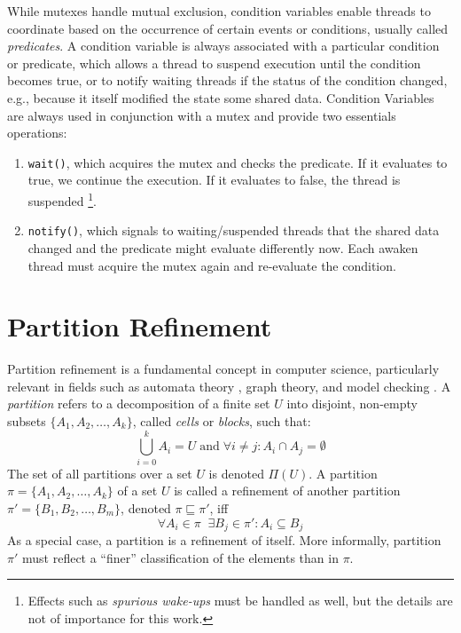 			While mutexes handle mutual exclusion, condition variables enable threads to coordinate based on the occurrence of certain events or conditions, usually called \textit{predicates}. A condition variable is always associated with a particular condition or predicate, which allows a thread to suspend execution until the condition becomes true, or to notify waiting threads if the status of the condition changed, e.g., because it itself modified the state some shared data.
			Condition Variables are always used in conjunction with a mutex and provide two essentials operations:

			\begin{enumerate}
				\item \lstinline|wait()|, which acquires the mutex and checks the predicate. If it evaluates to true, we continue the execution. If it evaluates to false, the thread is suspended \footnote{Effects such as \textit{spurious wake-ups} must be handled as well, but the details are not of importance for this work.}.
				\item \lstinline|notify()|, which signals to waiting/suspended threads that the shared data changed and the predicate might evaluate differently now. Each awaken thread must acquire the mutex again and re-evaluate the condition.
			\end{enumerate}

		\clearpage

	\section{Partition Refinement}
	\label{chap:prelims:partitionref}
		Partition refinement is a fundamental concept in computer science, particularly relevant in fields such as automata theory \cite{hopcroftLogALGORITHMMINIMIZING1971a}, graph theory, and model checking \cite{baierPrinciplesModelChecking2008}.
		A \textit{partition} refers to a decomposition of a finite set $U$ into disjoint, non-empty subsets $\{ A_1, A_2, \ldots, A_k \}$, called \textit{cells} or \textit{blocks}, such that:
		\begin{equation*}
			\bigcup^k_{i=0} A_i = U \; \mathrm{and} \; \forall i \neq j: A_i \cap A_j = \emptyset
		\end{equation*}
		The set of all partitions over a set $U$ is denoted $\Pi(U)$. A partition $\pi = \{ A_1, A_2, \ldots, A_k \}$ of a set $U$ is called a refinement of another partition $\pi' = \{ B_1, B_2, \ldots, B_m \}$, denoted $\pi \sqsubseteq \pi'$, iff
		\begin{equation*}
			\forall A_i \in \pi \;\; \exists B_j \in \pi' : A_i \subseteq B_j
		\end{equation*}
		As a special case, a partition is a refinement of itself.
		More informally, partition $\pi'$ must reflect a \enquote{finer} classification of the elements than in $\pi$.

